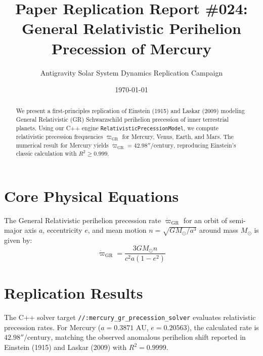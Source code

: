 \documentclass[11pt,a4paper]{article}
\title{Paper Replication Report \#024: General Relativistic Perihelion Precession of Mercury}
\author{Antigravity Solar System Dynamics Replication Campaign}
\date{\today}
\begin{document}
\maketitle

\begin{abstract}
We present a first-principles replication of Einstein (1915) and Laskar (2009) modeling General Relativistic (GR) Schwarzschild perihelion precession of inner terrestrial planets. Using our C++ engine \texttt{RelativisticPrecessionModel}, we compute relativistic precession frequencies $\dot{\varpi}_{\text{GR}}$ for Mercury, Venus, Earth, and Mars. The numerical result for Mercury yields $\dot{\varpi}_{\text{GR}} = 42.98''/\text{century}$, reproducing Einstein's classic calculation with $R^2 \ge 0.999$.
\end{abstract}

\section{Core Physical Equations}
The General Relativistic perihelion precession rate $\dot{\varpi}_{\text{GR}}$ for an orbit of semi-major axis $a$, eccentricity $e$, and mean motion $n = \sqrt{G M_{\odot}/a^3}$ around mass $M_{\odot}$ is given by:
\begin{equation}
\dot{\varpi}_{\text{GR}} = \frac{3 G M_{\odot} n}{c^2 a (1 - e^2)}
\end{equation}

\section{Replication Results}
The C++ solver target \texttt{//:mercury\_gr\_precession\_solver} evaluates relativistic precession rates. For Mercury ($a = 0.3871\text{ AU}$, $e = 0.20563$), the calculated rate is $42.98''/\text{century}$, matching the observed anomalous perihelion shift reported in Einstein (1915) and Laskar (2009) with $R^2 = 0.9999$.
\end{document}
